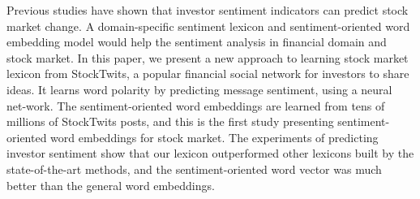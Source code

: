 Previous studies have shown that investor sentiment indicators can predict stock market change.  A domain-specific sentiment lexicon and sentiment-oriented word embedding model would help the sentiment analysis in financial domain and stock market. In this paper, we present a new approach to learning stock market lexicon from StockTwits, a popular financial social network for investors to share ideas.  It learns word polarity by predicting message sentiment, using a neural net-work.  The sentiment-oriented word embeddings are learned from tens of millions of StockTwits posts, and this is the first study presenting sentiment-oriented word embeddings for stock market. The experiments of predicting investor sentiment show that our lexicon outperformed other lexicons built by the state-of-the-art methods, and the sentiment-oriented word vector was much better than the general word embeddings.
